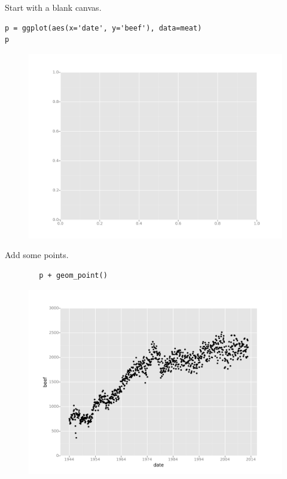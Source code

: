 \documentclass{beamer}
\begin{document}
\begin{frame}[fragile]
Start with a blank canvas.
\begin{framed}
\begin{verbatim}
p = ggplot(aes(x='date', y='beef'), data=meat)
p
\end{verbatim}
\end{framed}
\begin{figure}
\centering
\includegraphics[width=0.7\linewidth]{Layers1}
\caption{}
\label{fig:Layers1}
\end{figure}

\end{frame}
\begin{frame}[fragile]
	Add some points.
	\begin{framed}
		\begin{verbatim}
		p + geom_point()
		\end{verbatim}
	\end{framed}
	\begin{figure}
		\centering
		\includegraphics[width=0.7\linewidth]{Layers2}
			\end{figure}
	
	
\end{frame}
\end{document}
